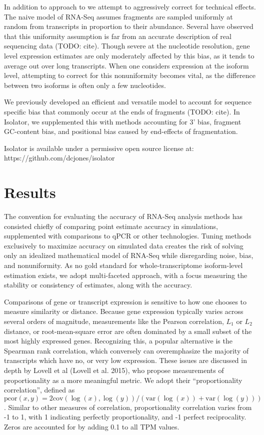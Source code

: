 \documentclass[twocolumn]{article}
\begin{document}
In addition to approach to we attempt to aggressively correct for
technical effects. The naive model of RNA-Seq assumes fragments are
sampled uniformly at random from transcripts in proportion to their
abundance. Several have observed that this uniformity assumption is far
from an accurate description of real sequencing data (TODO: cite).
Though severe at the nucleotide resolution, gene level expression
estimates are only moderately affected by this bias, as it tends to
average out over long transcripts. When one considers expression at the
isoform level, attempting to correct for this nonuniformity becomes
vital, as the difference between two isoforms is often only a few
nucleotides.

We previously developed an efficient and versatile model to account for
sequence specific bias that commonly occur at the ends of fragments
(TODO: cite). In Isolator, we supplemented this with methods accounting
for 3' bias, fragment GC-content bias, and positional bias caused by
end-effects of fragmentation.

Isolator is available under a permissive open source license at:
https://github.com/dcjones/isolator

\section{Results}\label{results}

The convention for evaluating the accuracy of RNA-Seq analysis methods
has consisted chiefly of comparing point estimate accuracy in
simulations, supplemented with comparisons to qPCR or other
technologies. Tuning methods exclusively to maximize accuracy on
simulated data creates the risk of solving only an idealized
mathematical model of RNA-Seq while disregarding noise, bias, and
nonuniformity. As no gold standard for whole-transcriptome isoform-level
estimation exists, we adopt multi-faceted approach, with a focus
measuring the stability or consistency of estimates, along with the
accuracy.

Comparisons of gene or transcript expression is sensitive to how one
chooses to measure similarity or distance. Because gene expression
typically varies across several orders of magnitude, measurements like
the Pearson correlation, $L_1$ or $L_2$ distance, or root-mean-square
error are often dominated by a small subset of the most highly expressed
genes. Recognizing this, a popular alternative is the Spearman rank
correlation, which conversely can overemphasize the majority of
transcripts which have no, or very low expression. These issues are
discussed in depth by Lovell et al (Lovell et al. 2015), who propose
measurements of proportionality as a more meaningful metric. We adopt
their ``proportionality correlation'', defined as
$\text{pcor}(x, y) = 2\text{cov}(\log(x), \log(y)) / (\text{var}(\log(x)) + \text{var}(\log(y)))$.
Similar to other measures of correlation, proportionality correlation
varies from -1 to 1, with 1 indicating perfectly proportionality, and -1
perfect reciprocality. Zeros are accounted for by adding 0.1 to all TPM
values.
\end{document}
